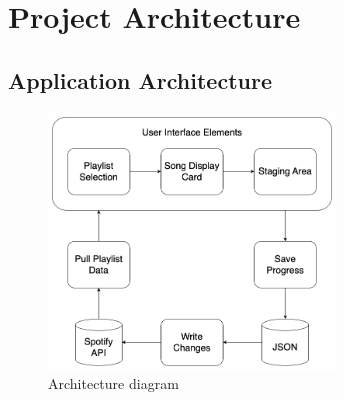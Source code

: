 \documentclass{article}
\begin{document}
    
    

\section{Project Architecture}
\subsection{Application Architecture}

\begin{figure}[ht]
  \centering
  \includegraphics[width=3in]{./arch.png}
  \caption{Architecture diagram}
  \label{fig:architecture_diagram}
\end{figure}
\end{document}
